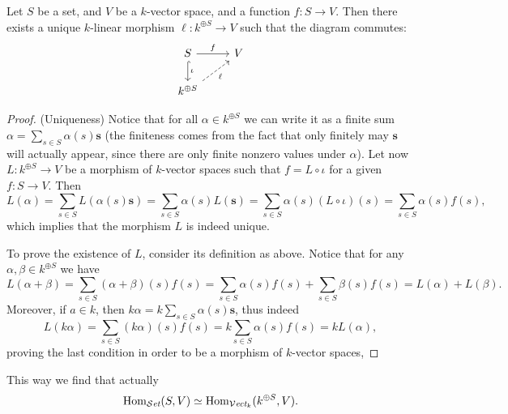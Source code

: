 \begin{proposition}
  \label{prop: universal property free vs}
  Let \(S\) be a set, and \(V\) be a \(k\)-vector space, and a function \(f : S
  \to V\). Then there exists a unique \(k\)-linear morphism \(\ell : k^{\oplus
  S} \to V\) such that the diagram commutes:
   \[
     \begin{tikzcd}
       S \ar[r, "f"] \ar[d, hook, "\iota"] &V \\
       k^{\oplus S} \ar[ru, dashed, swap, "\ell"]
     \end{tikzcd}
   \]
\end{proposition}

\begin{proof}
   (Uniqueness) Notice that for all \(\alpha \in k^{\oplus S}\) we can write it
   as a finite sum \(\alpha = \sum_{s \in S}\alpha(s) \mathbf s\) (the
   finiteness comes from the fact that only finitely may \(\mathbf s\) will
   actually appear, since there are only finite nonzero values under
   \(\alpha\)). Let now  \(L : k^{\oplus S} \to V\) be a morphism of
   \(k\)-vector spaces such that \(f = L \circ \iota\) for a given \(f : S \to
   V\). Then
   \[
      L(\alpha) = \sum_{s \in S} L(\alpha(s) \mathbf{s}) = \sum_{s \in S}
      \alpha(s) L(\mathbf s) = \sum_{s \in S} \alpha(s) (L \circ \iota)(s)
      = \sum_{s \in S} \alpha(s) f(s),
   \]
   which implies that the morphism \(L\) is indeed unique.

   To prove the existence of \(L\), consider its definition as above. Notice
   that for any \(\alpha, \beta \in k^{\oplus S}\) we have
   \[
      L(\alpha + \beta) = \sum_{s \in S} (\alpha + \beta)(s) f(s) = \sum_{s \in
      S} \alpha(s)f(s) + \sum_{s \in S} \beta(s)f(s) = L(\alpha) + L(\beta).
   \]
   Moreover, if \(a \in k\), then \(k \alpha = k\sum_{s \in S} \alpha(s)
   \mathbf s\), thus indeed
   \[
      L(k \alpha) = \sum_{s \in S} (k \alpha)(s) f(s) = k \sum_{s \in S}
      \alpha(s) f(s) = k L(\alpha),
   \]
   proving the last condition in order to be a morphism of \(k\)-vector spaces,
\end{proof}

This way we find that actually
\[
   \operatorname{Hom}_{{\mathcal{S}\textit{et}}}(S, V) \simeq \operatorname{Hom}_{{\mathcal{V}\textit{ect}}_k}(k^{\oplus S}, V).
\]

